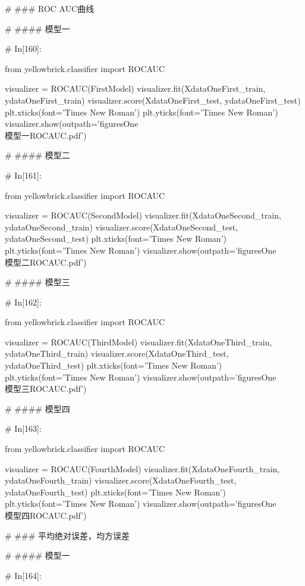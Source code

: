 \documentclass{MathorCupmodeling}
\begin{document}
\begin{python}
	# ### ROC AUC曲线
	
	# #### 模型一
	
	# In[160]:
	
	
	from yellowbrick.classifier import ROCAUC
	
	visualizer = ROCAUC(FirstModel)
	visualizer.fit(XdataOneFirst_train, ydataOneFirst_train)
	visualizer.score(XdataOneFirst_test, ydataOneFirst_test)
	plt.xticks(font='Times New Roman')
	plt.yticks(font='Times New Roman')
	visualizer.show(outpath='figuresOne\\[附件1]模型一ROCAUC.pdf')
	
	# #### 模型二
	
	# In[161]:
	
	
	from yellowbrick.classifier import ROCAUC
	
	visualizer = ROCAUC(SecondModel)
	visualizer.fit(XdataOneSecond_train, ydataOneSecond_train)
	visualizer.score(XdataOneSecond_test, ydataOneSecond_test)
	plt.xticks(font='Times New Roman')
	plt.yticks(font='Times New Roman')
	visualizer.show(outpath='figuresOne\\[附件1]模型二ROCAUC.pdf')
	
	# #### 模型三
	
	# In[162]:
	
	
	from yellowbrick.classifier import ROCAUC
	
	visualizer = ROCAUC(ThirdModel)
	visualizer.fit(XdataOneThird_train, ydataOneThird_train)
	visualizer.score(XdataOneThird_test, ydataOneThird_test)
	plt.xticks(font='Times New Roman')
	plt.yticks(font='Times New Roman')
	visualizer.show(outpath='figuresOne\\[附件1]模型三ROCAUC.pdf')
	
	# #### 模型四
	
	# In[163]:
	
	
	from yellowbrick.classifier import ROCAUC
	
	visualizer = ROCAUC(FourthModel)
	visualizer.fit(XdataOneFourth_train, ydataOneFourth_train)
	visualizer.score(XdataOneFourth_test, ydataOneFourth_test)
	plt.xticks(font='Times New Roman')
	plt.yticks(font='Times New Roman')
	visualizer.show(outpath='figuresOne\\[附件1]模型四ROCAUC.pdf')
	
	# ### 平均绝对误差，均方误差
	
	# #### 模型一
	
	# In[164]:
	

\end{python}
\end{document}
